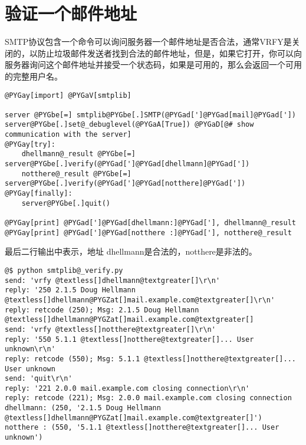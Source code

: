 \documentclass[a4paper,10pt,english]{manual}
\begin{document}
\section{验证一个邮件地址}

SMTP协议包含一个命令可以询问服务器一个邮件地址是否合法，通常VRFY是关闭的，以防止垃圾邮件发送者找到合法的邮件地址，但是，如果它打开，你可以向服务器询问这个邮件地址并接受一个状态码，如果是可用的，那么会返回一个可用的完整用户名。

\begin{Verbatim}[commandchars=@\[\]]
@PYGay[import] @PYGaV[smtplib]

server @PYGbe[=] smtplib@PYGbe[.]SMTP(@PYGad[']@PYGad[mail]@PYGad['])
server@PYGbe[.]set@_debuglevel(@PYGaA[True]) @PYGaD[@# show communication with the server]
@PYGay[try]:
    dhellmann@_result @PYGbe[=] server@PYGbe[.]verify(@PYGad[']@PYGad[dhellmann]@PYGad['])
    notthere@_result @PYGbe[=] server@PYGbe[.]verify(@PYGad[']@PYGad[notthere]@PYGad['])
@PYGay[finally]:
    server@PYGbe[.]quit()

@PYGay[print] @PYGad[']@PYGad[dhellmann:]@PYGad['], dhellmann@_result
@PYGay[print] @PYGad[']@PYGad[notthere :]@PYGad['], notthere@_result
\end{Verbatim}

最后二行输出中表示，地址 dhellmann是合法的，notthere是非法的。

\begin{Verbatim}[commandchars=@\[\]]
@$ python smtplib@_verify.py
send: 'vrfy @textless[]dhellmann@textgreater[]\r\n'
reply: '250 2.1.5 Doug Hellmann @textless[]dhellmann@PYGZat[]mail.example.com@textgreater[]\r\n'
reply: retcode (250); Msg: 2.1.5 Doug Hellmann @textless[]dhellmann@PYGZat[]mail.example.com@textgreater[]
send: 'vrfy @textless[]notthere@textgreater[]\r\n'
reply: '550 5.1.1 @textless[]notthere@textgreater[]... User unknown\r\n'
reply: retcode (550); Msg: 5.1.1 @textless[]notthere@textgreater[]... User unknown
send: 'quit\r\n'
reply: '221 2.0.0 mail.example.com closing connection\r\n'
reply: retcode (221); Msg: 2.0.0 mail.example.com closing connection
dhellmann: (250, '2.1.5 Doug Hellmann @textless[]dhellmann@PYGZat[]mail.example.com@textgreater[]')
notthere : (550, '5.1.1 @textless[]notthere@textgreater[]... User unknown')
\end{Verbatim}
\end{document}
